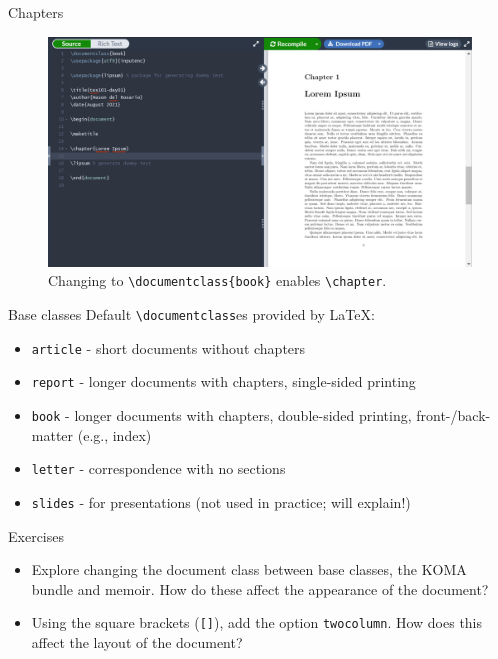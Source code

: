 \documentclass{beamer}
\begin{document}
{  \begin{frame}{Chapters}
    \begin{figure}
      \includegraphics[width=0.9\linewidth]{day01-overleaf-07C-chapter-fix.png}
      \caption{Changing to \texttt{\textbackslash documentclass\{book\}} enables \texttt{\textbackslash chapter}.}
      \label{fig:day01-overleaf-07C}
    \end{figure}
  \end{frame}

  \begin{frame}{Base classes}
    Default \texttt{\textbackslash documentclass}es provided by \LaTeX:
    \begin{itemize}
      \item \texttt{article} - short documents without chapters
      \item \texttt{report} - longer documents with chapters, single-sided printing
      \item \texttt{book} - longer documents with chapters, double-sided printing, front-/back-matter (e.g., index)
      \item \texttt{letter} - correspondence with no sections
      \item \texttt{slides} - for presentations (not used in practice; will explain!)
    \end{itemize}
  \end{frame}

  \begin{frame}{Exercises}
    \begin{itemize}
      \item Explore changing the document class between base classes, the KOMA bundle and memoir. How do these affect the appearance of the document?
      \item Using the square brackets (\texttt{[]}), add the option \texttt{twocolumn}. How does this affect the layout of the document?
    \end{itemize}
  \end{frame}

}
\end{document}
